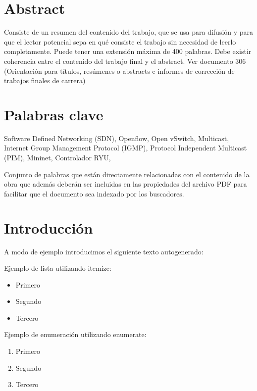 \documentclass[12pt,a4paper,oneside]{book}
\begin{document}
\chapter*{Abstract}

Consiste de un resumen del contenido del trabajo, que se usa para difusión y para que el lector potencial sepa en qué consiste el trabajo sin necesidad de leerlo completamente. Puede tener una extensión máxima de 400 palabras. Debe existir coherencia entre el contenido del trabajo final y el abstract. Ver documento 306 (Orientación para títulos, resúmenes o abstracts e informes de corrección de trabajos finales de carrera)



\chapter*{Palabras clave}

Software Defined Networking (SDN), Openflow, Open vSwitch, Multicast, Internet Group Management Protocol (IGMP), Protocol Independent Multicast (PIM), Mininet, Controlador RYU, %


\vspace{1cm}

Conjunto de palabras que están directamente relacionadas con el contenido de la obra que además deberán ser incluidas en las
propiedades del archivo PDF para facilitar que el documento sea indexado por los buscadores.


\tableofcontents


\chapter{Introducción} 
\label{intro} %

A modo de ejemplo introducimos el siguiente texto autogenerado:



Ejemplo de lista utilizando itemize:
\begin{itemize}
    \item Primero
    \item Segundo
    \item Tercero\\
\end{itemize}

Ejemplo de enumeración utilizando enumerate:
\begin{enumerate}
    \item Primero
    \item Segundo
    \item Tercero\\
\end{enumerate}
\end{document}
